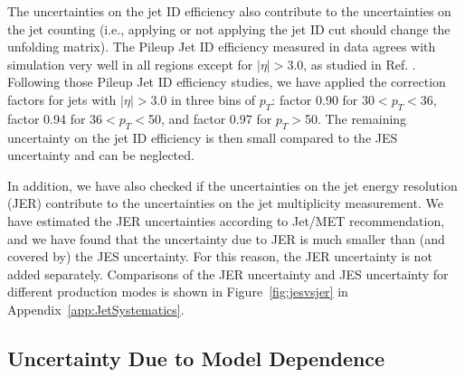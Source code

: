 The uncertainties on the jet ID efficiency also contribute to the uncertainties on the jet counting (i.e., applying or not applying the jet ID cut 
should change the unfolding matrix).
The Pileup Jet ID efficiency measured in data agrees with simulation very well in all regions except for $|\eta|>3.0$, as studied in 
Ref. \cite{Aad:pile_up_jet_ID}.
Following those Pileup Jet ID efficiency studies, we have applied the correction factors for jets with $|\eta|>3.0$ in three bins of $p_{T}$: factor
0.90 for 30$<p_{T}<$36, factor 0.94 for 36$<p_{T}<$50, and factor 0.97 for $p_{T}>$50. The remaining uncertainty on the jet ID efficiency is then small
compared to the JES uncertainty and can be neglected.
\par
In addition, we have also checked if the uncertainties on the jet energy resolution (JER) contribute to the uncertainties on the jet multiplicity
measurement. We have estimated the JER uncertainties according to Jet/MET recommendation, and we have found that the uncertainty due to JER is much smaller 
than (and covered by) the JES uncertainty. For this reason, the JER uncertainty is not added separately. Comparisons of the JER uncertainty and
JES uncertainty for different production modes is shown in Figure~\ref{fig:jesvsjer} in Appendix~\ref{app:JetSystematics}.

\subsection{Uncertainty Due to Model Dependence}

